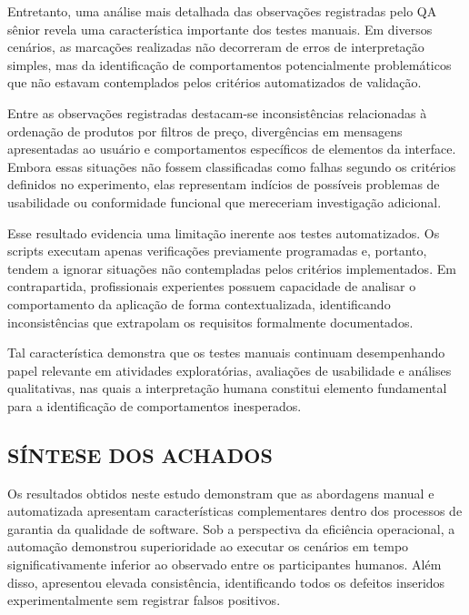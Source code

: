 \documentclass{UNESC}
\begin{document}
Entretanto, uma análise mais detalhada das observações registradas pelo QA sênior revela uma característica importante dos testes manuais. Em diversos cenários, as marcações realizadas não decorreram de erros de interpretação simples, mas da identificação de comportamentos potencialmente problemáticos que não estavam contemplados pelos critérios automatizados de validação.

Entre as observações registradas destacam-se inconsistências relacionadas à ordenação de produtos por filtros de preço, divergências em mensagens apresentadas ao usuário e comportamentos específicos de elementos da interface. Embora essas situações não fossem classificadas como falhas segundo os critérios definidos no experimento, elas representam indícios de possíveis problemas de usabilidade ou conformidade funcional que mereceriam investigação adicional.

Esse resultado evidencia uma limitação inerente aos testes automatizados. Os scripts executam apenas verificações previamente programadas e, portanto, tendem a ignorar situações não contempladas pelos critérios implementados. Em contrapartida, profissionais experientes possuem capacidade de analisar o comportamento da aplicação de forma contextualizada, identificando inconsistências que extrapolam os requisitos formalmente documentados.

Tal característica demonstra que os testes manuais continuam desempenhando papel relevante em atividades exploratórias, avaliações de usabilidade e análises qualitativas, nas quais a interpretação humana constitui elemento fundamental para a identificação de comportamentos inesperados.

\subsection{SÍNTESE DOS ACHADOS}

Os resultados obtidos neste estudo demonstram que as abordagens manual e automatizada apresentam características complementares dentro dos processos de garantia da qualidade de software. Sob a perspectiva da eficiência operacional, a automação demonstrou superioridade ao executar os cenários em tempo significativamente inferior ao observado entre os participantes humanos. Além disso, apresentou elevada consistência, identificando todos os defeitos inseridos experimentalmente sem registrar falsos positivos.
\end{document}
